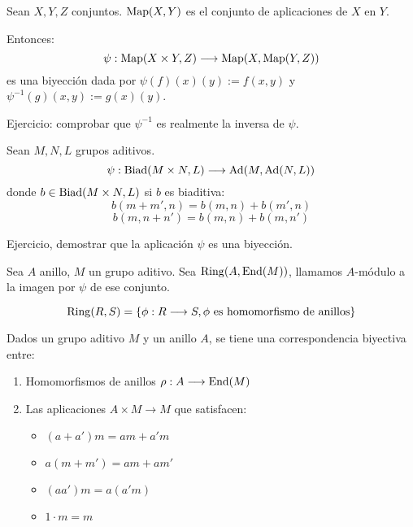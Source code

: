 \begin{obs}
  Sean  \(X, Y, Z\) conjuntos. \(\operatorname{Map}(X,Y)\) es el conjunto de
  aplicaciones de \(X\) en \(Y\).

  Entonces:
  \[
    \psi:\operatorname{Map}(X\times Y, Z)\longrightarrow\operatorname{Map}(X,\operatorname{Map}(Y,Z))
  \]
  es una biyección dada por \(\psi(f)(x)(y):=f(x,y)\) y
  \(\psi^{-1}(g)(x,y):=g(x)(y)\).
\end{obs}

Ejercicio: comprobar que \(\psi^{-1}\) es realmente la inversa de
\(\psi\).

\begin{obs}
  Sean \(M, N, L\) grupos aditivos.
  \[
    \psi:\operatorname{Biad}(M\times N, L)\longrightarrow\operatorname{Ad}(M,\operatorname{Ad}(N,L))
  \]
  donde \(b\in\operatorname{Biad}(M\times N, L)\) si \(b\) es biaditiva:
  \[
    b(m+m',n)=b(m,n)+b(m',n)
  \]\[
    b(m,n+n')=b(m,n)+b(m,n')
  \]
\end{obs}

Ejercicio, demostrar que la aplicación \(\psi\) es una biyección.

\begin{teo}
  Sea \(A\) anillo, \(M\) un grupo aditivo. Sea \(\operatorname{Ring}(A,\operatorname{End}(M))\),
  llamamos \(A\)-módulo a la imagen por \(\psi\) de ese conjunto.
\end{teo}

\begin{df}
  \[
    \operatorname{Ring}(R,S)=\{\phi:R\longrightarrow S, \phi \textrm{ es homomorfismo
    de anillos}\}
  \]
\end{df}


\begin{prop}
  Dados un grupo aditivo \(M\) y un anillo \(A\), se tiene una
  correspondencia biyectiva entre:
  \begin{enumerate}
    \item Homomorfismos de anillos \(\rho:A\longrightarrow\operatorname{End}(M)\)
    \item Las aplicaciones \(A\times M\longrightarrow M\)
      que satisfacen:
      \begin{itemize}
        \item \((a+a')m=am+a'm\)
        \item \(a(m+m')=am+am'\)
        \item \((aa')m=a(a'm)\)
        \item \(1\cdot m=m\)
      \end{itemize}
  \end{enumerate}
\end{prop}

